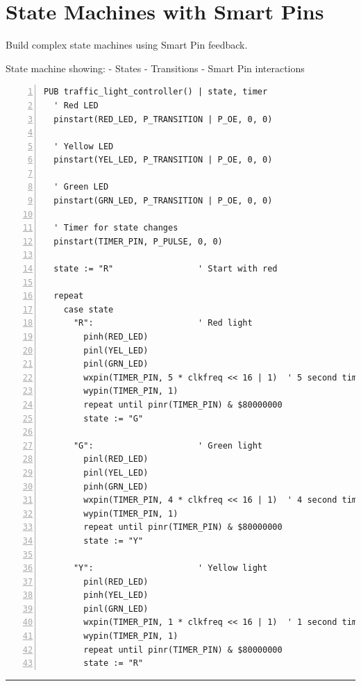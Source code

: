 \documentclass[11pt,a4paper,oneside,english]{book}
\begin{document}
\hypertarget{state-machines-with-smart-pins}{%
\section{State Machines with Smart
Pins}\label{state-machines-with-smart-pins}}

Build complex state machines using Smart Pin feedback.

State machine showing: - States - Transitions - Smart Pin interactions

\begin{Spin2Block}
\begin{Verbatim}[numbers=left,numbersep=5pt,xleftmargin=15pt]
PUB traffic_light_controller() | state, timer
  ' Red LED
  pinstart(RED_LED, P_TRANSITION | P_OE, 0, 0)
  
  ' Yellow LED  
  pinstart(YEL_LED, P_TRANSITION | P_OE, 0, 0)
  
  ' Green LED
  pinstart(GRN_LED, P_TRANSITION | P_OE, 0, 0)
  
  ' Timer for state changes
  pinstart(TIMER_PIN, P_PULSE, 0, 0)
  
  state := "R"                 ' Start with red
  
  repeat
    case state
      "R":                     ' Red light
        pinh(RED_LED)
        pinl(YEL_LED)
        pinl(GRN_LED)
        wxpin(TIMER_PIN, 5 * clkfreq << 16 | 1)  ' 5 second timer
        wypin(TIMER_PIN, 1)
        repeat until pinr(TIMER_PIN) & $80000000
        state := "G"
        
      "G":                     ' Green light
        pinl(RED_LED)
        pinl(YEL_LED)
        pinh(GRN_LED)
        wxpin(TIMER_PIN, 4 * clkfreq << 16 | 1)  ' 4 second timer
        wypin(TIMER_PIN, 1)
        repeat until pinr(TIMER_PIN) & $80000000
        state := "Y"
        
      "Y":                     ' Yellow light
        pinl(RED_LED)
        pinh(YEL_LED)
        pinl(GRN_LED)
        wxpin(TIMER_PIN, 1 * clkfreq << 16 | 1)  ' 1 second timer
        wypin(TIMER_PIN, 1)
        repeat until pinr(TIMER_PIN) & $80000000
        state := "R"
\end{Verbatim}
\end{Spin2Block}

\begin{center}\rule{0.5\linewidth}{0.5pt}\end{center}

\clearpage

\clearpage
\end{document}
